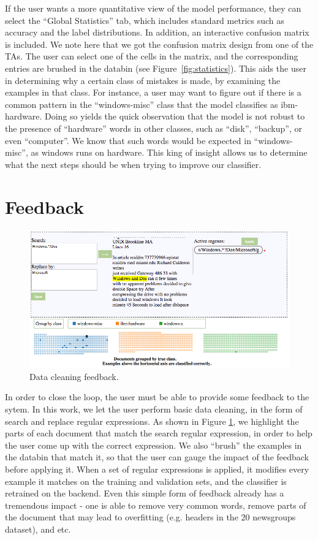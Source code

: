 \documentclass{chi2009}
\begin{document}
If the user wants a more quantitative view of the model performance, they can
select the ``Global Statistics'' tab, which includes standard metrics such as
accuracy and the label distributions. In addition, an interactive confusion
matrix is included. We note here that we got the confusion matrix design from
one of the TAs. The user can select one of the cells in the matrix, and the
corresponding entries are brushed in the databin (see
Figure~\ref{fig:statistics}). This aids the user in determining why a certain
class of mistakes is made, by examining the examples in that class. For
instance, a user may want to figure out if there is a common pattern in the
``windows-misc'' class that the model classifies as ibm-hardware. Doing so
yields the quick observation that the model is not robust to the presence of
``hardware'' words in other classes, such as ``disk'', ``backup'', or even
``computer''. We know that such words would be expected in ``windows-misc'', as
windows runs on hardware. This king of insight allows us to determine what the
next steps should be when trying to improve our classifier.
\section{Feedback}
\begin{figure}
  \includegraphics[width=.5\textwidth]{feedback}
  \caption{Data cleaning feedback.}
  \label{fig:feedback}
\end{figure}
In order to close the loop, the user must be able to provide some feedback to
the sytem. In this work, we let the user perform basic data cleaning, in the
form of search and replace regular expressions. As shown in Figure
\ref{fig:feedback}, we highlight the parts of each
document that match the search regular expression, in order to help the user
come up with the correct expression. We also ``brush'' the examples in the
databin that match it, so that the user can gauge the impact of the feedback
before applying it. When a set of regular expressions is applied, it modifies
every example it matches on the training and validation sets, and the classifier
is retrained on the backend. Even this simple form of feedback already has a tremendous
impact - one is able to remove very common words, remove parts of the document
that may lead to overfitting (e.g. headers in the 20 newsgroups dataset), and
etc.
\end{document}
